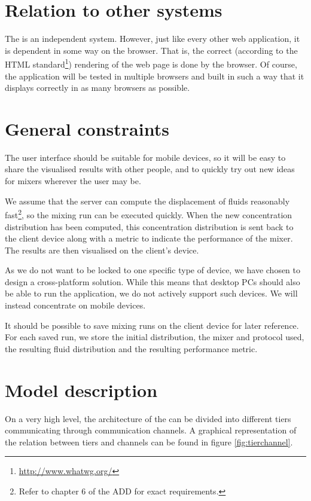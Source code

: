 \section{Relation to other systems}
\label{sec:othersys}
The \applicationname{} is an independent system. However, just like every other web application, it is dependent in some way on the browser. That is, the correct (according to the HTML standard\footnote{\url{http://www.whatwg.org/}}) rendering of the web page is done by the browser. Of course, the application will be tested in multiple browsers and built in such a way that it displays correctly in as many browsers as possible.

\section{General constraints}
\label{sec:genconst}
The user interface should be suitable for mobile devices, so it will be easy to share the visualised results with other people, and to quickly try out new ideas for mixers wherever the user may be.

We assume that the server can compute the displacement of fluids reasonably fast\footnote{Refer to chapter 6 of the ADD \cite{add} for exact requirements.}, so the mixing run can be executed quickly. When the new concentration distribution has been computed, this concentration distribution is sent back to the client device along with a metric to indicate the performance of the mixer. The results are then visualised on the client's device.

As we do not want to be locked to one specific type of device, we have chosen to design a cross-platform solution. While this means that desktop PCs should also be able to run the application, we do not actively support such devices. We will instead concentrate on mobile devices.

It should be possible to save mixing runs on the client device for later reference. For each saved run, we store the initial distribution, the mixer and protocol
used, the resulting fluid distribution and the resulting performance metric.

\section{Model description}
\label{sec:moddesc}
On a very high level, the architecture of the \applicationname{} can be divided into different tiers communicating through communication channels. A graphical representation of the relation between tiers and channels can be found in figure \ref{fig:tierchannel}.

